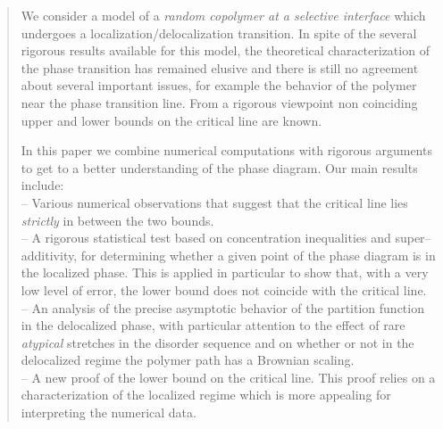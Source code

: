 \documentclass[reqno,11pt]{amsart}
\numberwithin{equation}{section}
\begin{document}
\begin{abstract}
We consider a model of a {\sl random copolymer at a selective interface} which undergoes a localization/delocalization transition. In spite of the several rigorous results  available for this model, the theoretical characterization of the phase transition has remained elusive and there is still no agreement about several important issues, for example the behavior of the polymer
near the phase transition line. From a rigorous viewpoint non coinciding upper and lower bounds on the critical line are known.

In this paper we combine numerical computations with rigorous arguments to get to a better understanding of the phase diagram. Our main results include:
\\
-- Various numerical observations  that suggest  that the critical line lies
\emph{strictly} in between the two  bounds.
\\
-- A rigorous statistical test based on concentration inequalities and super--additivity,
for determining  whether a given point of the phase diagram is in the localized phase. This is applied
in particular to show that, with a very low level of error, the lower bound does not coincide with the critical line.
\\
-- An analysis of the precise asymptotic behavior of the partition function in the delocalized phase, with particular attention to the effect of rare {\sl atypical} stretches
in the disorder sequence   and on whether or not in the delocalized regime
the polymer path has a Brownian scaling.
\\
-- A new proof of the lower bound on the critical line. This proof
relies on a characterization of the localized regime which is more appealing for
interpreting the numerical data.
%
%

\end{abstract}
\end{document}
